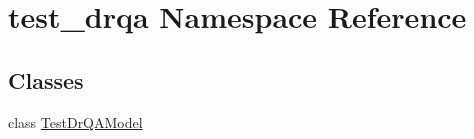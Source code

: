 \hypertarget{namespacetest__drqa}{}\section{test\+\_\+drqa Namespace Reference}
\label{namespacetest__drqa}
\subsection*{Classes}
\begin{DoxyCompactItemize}
\item 
class \hyperlink{classtest__drqa_1_1TestDrQAModel}{Test\+Dr\+Q\+A\+Model}
\end{DoxyCompactItemize}
